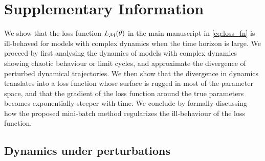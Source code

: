 
\graphicspath{{./content/chap3_mini-batching/}}


\section{Supplementary Information}
\label{secSI:supmat}

We show that the loss function $L_{\mathcal{M}}(\theta)$ in the main manuscript in \cref{eq:loss_fn} is ill-behaved for models with complex dynamics when the time horizon is large. We proceed by first analysing the dynamics of models with complex dynamics showing chaotic behaviour or limit cycles, and approximate the divergence of perturbed dynamical trajectories. We then show that the divergence in dynamics translates into a loss function whose surface is rugged in most of the parameter space, and that the gradient of the loss function around the true parameters becomes exponentially steeper with time. We conclude by formally discussing how the proposed mini-batch method regularizes the ill-behaviour of the loss function.

\subsection{Dynamics under perturbations}

